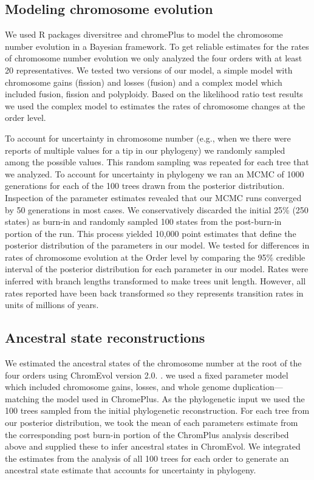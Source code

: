 \subsection{Modeling chromosome evolution}
We used R packages diversitree \citep{fitzjohn2012} and chromePlus \citep{blackmon2019meiotic} to model the chromosome number evolution in a Bayesian framework.
To get reliable estimates for the rates of chromosome number evolution we only analyzed the four orders with at least 20 representatives.
We tested two versions of our model, a simple model with chromosome gains (fission) and losses (fusion) and a complex model which included fusion, fission and polyploidy.
Based on the likelihood ratio test results we used the complex model to estimates the rates of chromosome changes at the order level.

To account for uncertainty in chromosome number (e.g., when we there were reports of multiple values for a tip in our phylogeny) we randomly sampled among the possible values.
This random sampling was repeated for each tree that we analyzed.
To account for uncertainty in phylogeny we ran an MCMC of 1000 generations for each of the 100 trees drawn from the posterior distribution.
Inspection of the parameter estimates revealed that our MCMC runs converged by 50 generations in most cases.  
We conservatively discarded the initial 25\% (250 states) as burn-in and randomly sampled 100 states from the post-burn-in portion of the run. 
This process yielded 10,000 point estimates that define the posterior distribution of the parameters in our model.
We tested for differences in rates of chromosome evolution at the Order level by comparing the 95\% credible interval of the posterior distribution for each parameter in our model.
Rates were inferred with branch lengths transformed to make trees unit length.
However, all rates reported have been back transformed so they represents transition rates in units of millions of years.

\subsection{Ancestral state reconstructions}
We estimated the ancestral states of the chromosome number at the root of the four orders using ChromEvol version 2.0. \citep{glick2014chromevol, mayrose2009chromevol}.
we used a fixed parameter model which included chromosome gains, losses, and whole genome duplication---matching the model used in ChromePlus.
As the phylogenetic input we used the 100 trees sampled from the initial phylogenetic reconstruction. 
For each tree from our posterior distribution, we took the mean of each parameters estimate from the corresponding post burn-in portion of the ChromPlus analysis described above and supplied these to infer ancestral states in ChromEvol.
We integrated the estimates from the analysis of all 100 trees for each order to generate an ancestral state estimate that accounts for uncertainty in phylogeny. 

